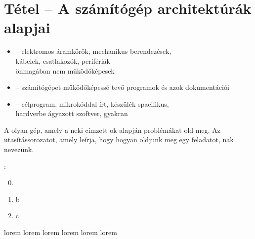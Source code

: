 \documentclass[main.tex]{subfiles}
\begin{document}
  \section{Tétel – A számítógép architektúrák alapjai} %

  \begin{itemize}
    \item {} \tabto{2cm} – \tabto{2.6cm}
    elektromos áramkörök, mechanikus berendezések, \\
    \tabto{2.6cm}kábelek, csatlakozók, perifériák \\
    \tabto{2.6cm}önmagában nem működőképesek
    
    \item {} \tabto{2cm} – \tabto{2.6cm}
    számítógépet működőképessé tevő
    programok és azok dokumentációi

    \item {} \tabto{2cm} – \tabto{2.6cm}
    célprogram, mikrokóddal írt, készülék spacifikus, \\
    \tabto{2.6cm}hardverbe ágyazott szoftver,
    gyakran 
  \end{itemize}

  A  olyan gép,
  amely a neki címzett ok alapján
  problémákat old meg. Az utasítássorozatot,
  amely leírja, hogy hogyan oldjunk meg egy feladatot,
  nak nevezünk.

  \vspace{1em}
  {\large {}:}
  \begin{enumerate}
    \setcounter{enumi}{-1} 
    \item 
    \item b
    \item c
  \end{enumerate}

  
  
  lorem
  lorem
  lorem
  lorem
  lorem
  lorem
\end{document}
